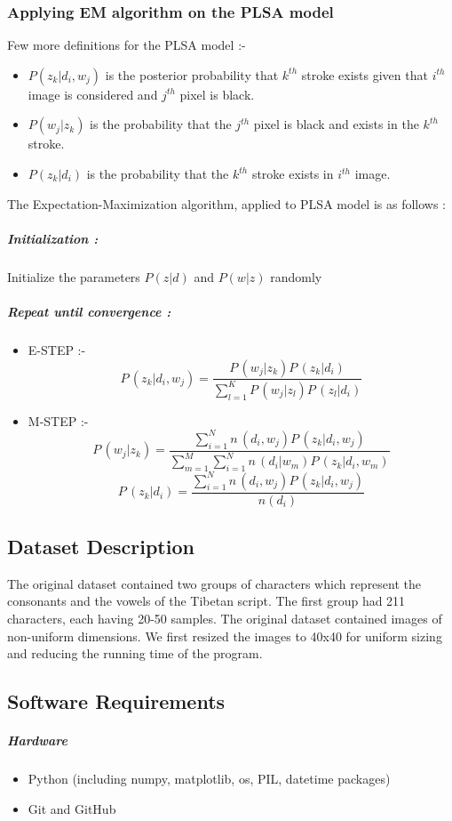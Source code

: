 \documentclass[10pt]{article}
\begin{document}
		\subsubsection{Applying EM algorithm on the PLSA model}
			Few more definitions for the PLSA model \cite{hoff1} :-
			\begin{itemize}
				\item 
				$P(z_k|d_i,w_j)$ is the posterior probability that $k^{th}$ stroke exists given that $i^{th}$ image is considered and $j^{th}$ pixel is black.
				\item
				$P(w_j|z_k)$ is the probability that the $j^{th}$ pixel is black and exists in the $k^{th}$ stroke.
				\item
				$P(z_k|d_i)$ is the probability that the $k^{th}$ stroke exists in $i^{th}$ image.
			\end{itemize}
			The Expectation-Maximization \cite{dataera} algorithm, applied to PLSA model is as follows :
			\subparagraph{Initialization :}
				Initialize the parameters $P(z|d)$ and $P(w|z)$ randomly
			\subparagraph{Repeat until convergence :}
			\begin{itemize}
				\item
				E-STEP :- 
				\[ P\,(z_k|d_i,w_j) = \dfrac{P\,(w_j|z_k)P\,(z_k|d_i)}{\sum_{l=1}^{K}P\,(w_j|z_l)P\,(z_l|d_i)} \]
				\item
				M-STEP :-
				\[ P\,(w_j|z_k) = \dfrac{\sum_{i=1}^{N}n\,(d_i,w_j)P\,(z_k|d_i,w_j)}{\sum_{m=1}^{M}\sum_{i=1}^{N}n\,(d_i|w_m)P\,(z_k|d_i,w_m)} \]
				\[ P\,(z_k|d_i) = \dfrac{\sum_{i=1}^{N}n\,(d_i,w_j)P\,(z_k|d_i,w_j)}{n(d_i)} \]
			\end{itemize}	 
	\subsection{Dataset Description}
		The original dataset contained two groups of characters which represent the consonants and the vowels of the Tibetan script. The first group had 211 characters, each having 20-50 samples. The original dataset contained images of non-uniform dimensions. We first resized the images to 40x40 for uniform sizing and reducing the running time of the program.
		
	\subsection{Software Requirements}
		\subparagraph{Hardware}
			\begin{itemize}
				\item 
				Python (including  numpy, matplotlib, os, PIL, datetime packages)
				\item
				Git and GitHub
			\end{itemize}
\end{document}
